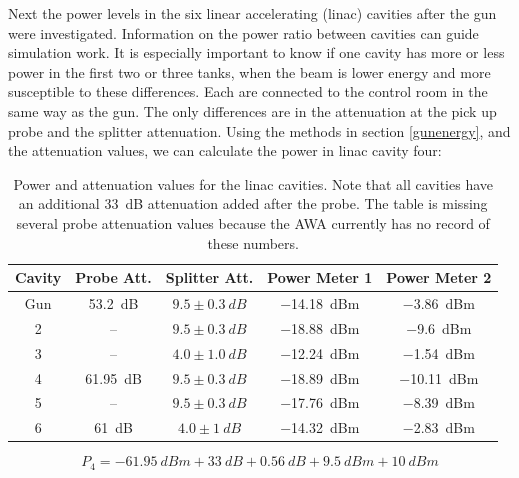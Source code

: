 Next the power levels in the six linear accelerating (linac) cavities after the gun
were investigated. Information on the power ratio between cavities can 
guide simulation work. It is especially important to know if one cavity
has more or less power in the first two or three tanks, when the beam is 
lower energy and more susceptible to these differences.
Each are connected to the control room in the same way as the gun. 
The only differences are in the attenuation at the pick up probe and 
the splitter attenuation. Using the methods in section \ref{gunenergy}, 
and the attenuation values, we can calculate the power in linac cavity four:
\begin{table} %
	\caption{\label{tab:powerlinac} Power and attenuation values for the 
		linac cavities. Note that all cavities have an additional 
		\SI{33}{dB} attenuation added after the probe.
		The table is missing several probe attenuation values because the
		AWA currently has no record of these numbers.}
	\begin{center}
		\begin{tabular}{ccccc}	
			\toprule
			\toprule
			\textbf{Cavity} & \textbf{Probe Att.} & \textbf{Splitter Att.} & \textbf{Power Meter 1}  & \textbf{Power Meter 2} \\
			\midrule
			Gun & \SI{53.2}{dB}& $9.5 \pm \SI{0.3}{dB}$ & \SI{-14.18}{dBm} & \SI{-3.86}{dBm}  \\
			2 & --       & $9.5 \pm \SI{0.3}{dB}$ & \SI{-18.88}{dBm} & \SI{-9.6}{dBm}  \\
			3 & --       & $4.0 \pm \SI{1.0}{dB}$ & \SI{-12.24}{dBm} & \SI{-1.54}{dBm}  \\
			4 & \SI{61.95}{dB} & $9.5 \pm \SI{0.3}{dB}$ & \SI{-18.89}{dBm} & \SI{-10.11}{dBm}  \\
			5 & --       & $9.5 \pm \SI{0.3}{dB}$ & \SI{-17.76}{dBm} & \SI{-8.39}{dBm}  \\
			6 & \SI{61}{dB}    & $4.0 \pm \SI{1}{dB}$  & \SI{-14.32}{dBm} & \SI{-2.83}{dBm} \\
			\bottomrule
		\end{tabular}
	\end{center}
\end{table}
\begin{equation}
P_4 = \SI{-61.95}{dBm} + \SI{33}{dB} + \SI{0.56}{dB} + \SI{9.5}{dBm} +\SI{10}{dBm}
\end{equation}


